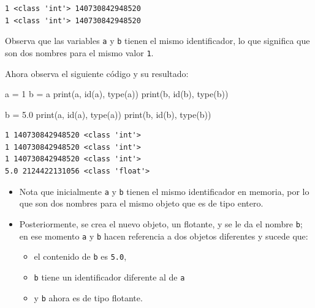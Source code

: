\documentclass[
  spanish,
  letterpaper,
]{scrbook}
\newenvironment{Shaded}{\begin{snugshade}}{\end{snugshade}}
\newcommand{\BuiltInTok}[1]{\textcolor[rgb]{0.00,0.23,0.31}{#1}}
\newcommand{\DecValTok}[1]{\textcolor[rgb]{0.68,0.00,0.00}{#1}}
\newcommand{\FloatTok}[1]{\textcolor[rgb]{0.68,0.00,0.00}{#1}}
\newcommand{\NormalTok}[1]{\textcolor[rgb]{0.00,0.23,0.31}{#1}}
\newcommand{\OperatorTok}[1]{\textcolor[rgb]{0.37,0.37,0.37}{#1}}
\providecommand{\tightlist}{%
  \setlength{\itemsep}{0pt}\setlength{\parskip}{0pt}}
\theoremstyle{definition}
\theoremstyle{remark}
\begin{document}
\begin{verbatim}
1 <class 'int'> 140730842948520
1 <class 'int'> 140730842948520
\end{verbatim}

Observa que las variables \texttt{a} y \texttt{b} tienen el mismo
identificador, lo que significa que son dos nombres para el mismo valor
\texttt{1}.

Ahora observa el siguiente código y su resultado:

\begin{Shaded}
\begin{Highlighting}[]
\NormalTok{a }\OperatorTok{=} \DecValTok{1}
\NormalTok{b }\OperatorTok{=}\NormalTok{ a}
\BuiltInTok{print}\NormalTok{(a, }\BuiltInTok{id}\NormalTok{(a), }\BuiltInTok{type}\NormalTok{(a))}
\BuiltInTok{print}\NormalTok{(b, }\BuiltInTok{id}\NormalTok{(b), }\BuiltInTok{type}\NormalTok{(b))}

\NormalTok{b }\OperatorTok{=} \FloatTok{5.0}
\BuiltInTok{print}\NormalTok{(a, }\BuiltInTok{id}\NormalTok{(a), }\BuiltInTok{type}\NormalTok{(a))}
\BuiltInTok{print}\NormalTok{(b, }\BuiltInTok{id}\NormalTok{(b), }\BuiltInTok{type}\NormalTok{(b))}
\end{Highlighting}
\end{Shaded}

\begin{verbatim}
1 140730842948520 <class 'int'>
1 140730842948520 <class 'int'>
1 140730842948520 <class 'int'>
5.0 2124422131056 <class 'float'>
\end{verbatim}

\begin{itemize}
\tightlist
\item
  Nota que inicialmente \texttt{a} y \texttt{b} tienen el mismo
  identificador en memoria, por lo que son dos nombres para el mismo
  objeto que es de tipo entero.
\item
  Posteriormente, se crea el nuevo objeto, un flotante, y se le da el
  nombre \texttt{b}; en ese momento \texttt{a} y \texttt{b} hacen
  referencia a dos objetos diferentes y sucede que:

  \begin{itemize}
  \tightlist
  \item
    el contenido de \texttt{b} es \texttt{5.0},
  \item
    \texttt{b} tiene un identificador diferente al de \texttt{a}
  \item
    y \texttt{b} ahora es de tipo flotante.
  \end{itemize}
\end{itemize}
\end{document}
